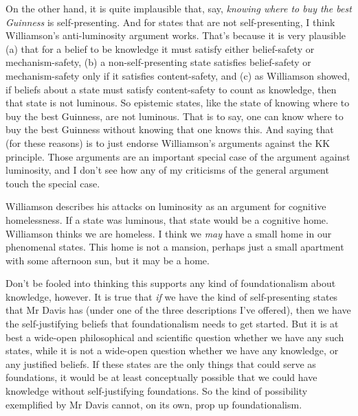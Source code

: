 On the other hand, it is quite implausible that, say, \textit{knowing where to buy the best Guinness} is self-presenting. And for states that are not self-presenting, I think Williamson's anti-luminosity argument works. That's because it is very plausible (a) that for a belief to be knowledge it must satisfy either belief-safety or mechanism-safety, (b) a non-self-presenting state satisfies belief-safety or mechanism-safety only if it satisfies content-safety, and (c) as Williamson showed, if beliefs about a state must satisfy content-safety to count as knowledge, then that state is not luminous. So epistemic states, like the state of knowing where to buy the best Guinness, are not luminous. That is to say, one can know where to buy the best Guinness without knowing that one knows this. And saying that (for these reasons) is to just endorse Williamson's arguments against the KK principle. Those arguments are an important special case of the argument against luminosity, and I don't see how any of my criticisms of the general argument touch the special case.

\begin{sloppypar}Williamson describes his attacks on luminosity as an argument for cognitive homelessness. If a state was luminous, that state would be a cognitive home. Williamson thinks we are homeless. I think we \textit{may }have a small home in our phenomenal states. This home is not a mansion, perhaps just a small apartment with some afternoon sun, but it may be a home.\end{sloppypar}

Don't be fooled into thinking this supports any kind of foundationalism about knowledge, however. It is true that \textit{if} we have the kind of self-presenting states that Mr Davis has (under one of the three descriptions I've offered), then we have the self-justifying beliefs that foundationalism needs to get started. But it is at best a wide-open philosophical and scientific question whether we have any such states, while it is not a wide-open question whether we have any knowledge, or any justified beliefs. If these states are the only things that could serve as foundations, it would be at least conceptually possible that we could have knowledge without self-justifying foundations. So the kind of possibility exemplified by Mr Davis cannot, on its own, prop up foundationalism.

%


